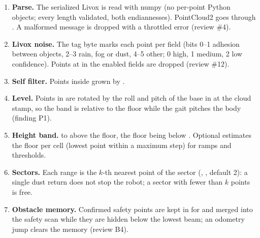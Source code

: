 \begin{enumerate}
  \item \textbf{Parse.} The serialized Livox  is read with numpy (no per-point
    Python objects; every length validated, both endiannesses). PointCloud2 goes through
    . A malformed message is dropped with a
    throttled error (review \#4).
  \item \textbf{Livox noise.} The tag byte marks each point per field (bits 0--1 adhesion
    between objects, 2--3 rain, fog or dust, 4--5 other; 0 high, 1 medium, 2 low confidence).
    Points at  in the enabled fields are dropped (review \#12).
  \item \textbf{Self filter.} Points inside  grown by
    .
  \item \textbf{Level.} Points in  are rotated by the roll and pitch of the base
    in  at the cloud stamp, so the band is relative to the floor while the gait pitches
    the body (finding P1).
  \item \textbf{Height band.}  to  above the
    floor, the floor being  below . Optional
     estimates the floor per cell (lowest point within a
    maximum step) for ramps and thresholds.
  \item \textbf{Sectors.} Each range is the $k$-th nearest point of the sector (,
    , default 2): a single dust return does not stop the robot; a sector with
    fewer than $k$ points is free.
  \item \textbf{Obstacle memory.} Confirmed safety points are kept in  for
     and merged into the safety scan while they are hidden below the
    lowest beam; an odometry jump clears the memory (review B4).
\end{enumerate}

